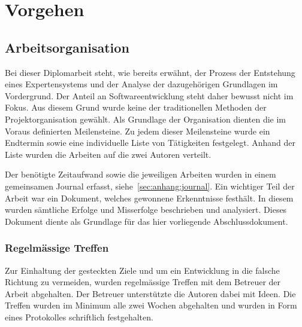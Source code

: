 \chapter{Vorgehen}
\label{chap:vorgehen}


\section{Arbeitsorganisation}
\label{sec:vorgehen_orga}

Bei dieser Diplomarbeit steht, wie bereits erwähnt, der Prozess der Entstehung eines Expertensystems und der Analyse der dazugehörigen Grundlagen im Vordergrund. Der Anteil an Softwareentwicklung steht daher bewusst nicht im Fokus. Aus diesem Grund wurde keine der traditionellen Methoden der Projektorganisation gewählt.
Als Grundlage der Organisation dienten die im Voraus definierten Meilensteine. Zu jedem dieser Meilensteine wurde ein Endtermin sowie eine individuelle Liste von Tätigkeiten festgelegt. Anhand der Liste wurden die Arbeiten auf die zwei Autoren verteilt.

Der benötigte Zeitaufwand sowie die jeweiligen Arbeiten wurden in einem gemeinsamen Journal erfasst, siehe~\ref{sec:anhang:journal}. Ein wichtiger Teil der Arbeit war ein Dokument, welches gewonnene Erkenntnisse festhält. In diesem wurden sämtliche Erfolge und Misserfolge beschrieben und analysiert. Dieses Dokument diente als Grundlage für das hier vorliegende Abschlussdokument.

\subsection{Regelmässige Treffen}
\label{sec:vorgehen_orga_treffen}
Zur Einhaltung der gesteckten Ziele und um ein Entwicklung in die falsche Richtung zu vermeiden, wurden regelmässige Treffen mit dem Betreuer der Arbeit abgehalten. Der Betreuer unterstützte die Autoren dabei mit Ideen. Die Treffen wurden im Minimum alle zwei Wochen abgehalten und wurden in Form eines Protokolles schriftlich festgehalten.

